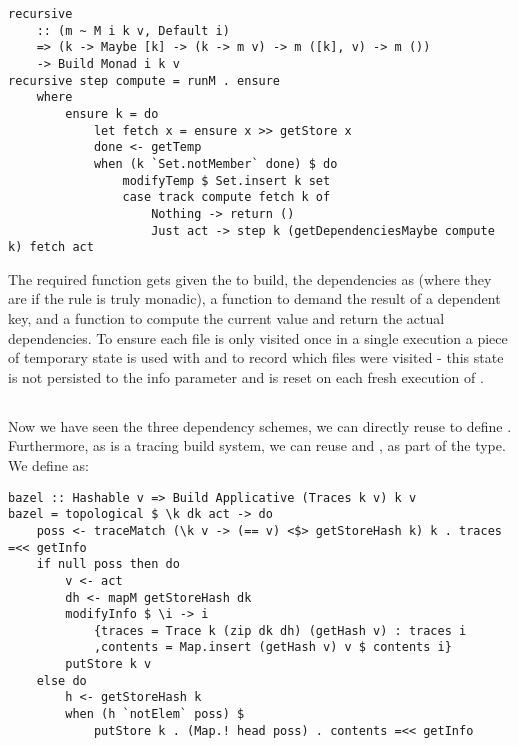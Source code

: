 \begin{verbatim}
recursive
    :: (m ~ M i k v, Default i)
    => (k -> Maybe [k] -> (k -> m v) -> m ([k], v) -> m ())
    -> Build Monad i k v
recursive step compute = runM . ensure
    where
        ensure k = do
            let fetch x = ensure x >> getStore x
            done <- getTemp
            when (k `Set.notMember` done) $ do
                modifyTemp $ Set.insert k set
                case track compute fetch k of
                    Nothing -> return ()
                    Just act -> step k (getDependenciesMaybe compute k) fetch act
\end{verbatim}

The required  function gets given the  to build, the dependencies as  (where they are  if the rule is truly monadic), a function to demand the result of a dependent key, and a function to compute the current value and return the actual dependencies. To ensure each file is only visited once in a single execution a piece of temporary state is used with  and  to record which files were visited - this state is not persisted to the  info parameter and is reset on each fresh execution of .

\subsection{\Bazel}\label{sec-implementation-bazel}


Now we have seen the three dependency schemes, we can directly reuse  to define \Bazel. Furthermore, as \Bazel is a tracing build system, we can reuse  and , as part of the  type. We define \Bazel as:

\begin{verbatim}
bazel :: Hashable v => Build Applicative (Traces k v) k v
bazel = topological $ \k dk act -> do
    poss <- traceMatch (\k v -> (== v) <$> getStoreHash k) k . traces =<< getInfo
    if null poss then do
        v <- act
        dh <- mapM getStoreHash dk
        modifyInfo $ \i -> i
            {traces = Trace k (zip dk dh) (getHash v) : traces i
            ,contents = Map.insert (getHash v) v $ contents i}
        putStore k v
    else do
        h <- getStoreHash k
        when (h `notElem` poss) $
            putStore k . (Map.! head poss) . contents =<< getInfo
\end{verbatim}


